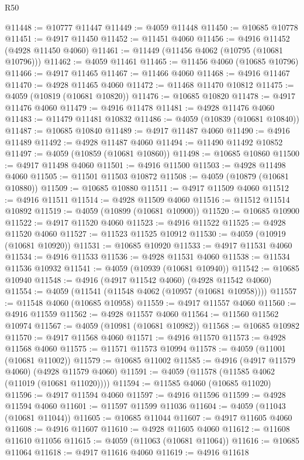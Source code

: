 \begin{lexlean}{R50}
\begin{coremodule}
@11448 := @10777 @11447
@11449 := @4059 @11448
@11450 := @10685 @10778
@11451 := @4917 @11450
@11452 := @11451 @4060
@11456 := @4916 @11452 (@4928 @11450 @4060)
@11461 := @11449 (@11456 @4062 (@10795 (@10681 @10796)))
@11462 := @4059 @11461
@11465 := @11456 @4060 (@10685 @10796)
@11466 := @4917 @11465
@11467 := @11466 @4060
@11468 := @4916 @11467
@11470 := @4928 @11465 @4060
@11472 := @11468 @11470 @10812
@11475 := @4059 (@10819 (@10681 @10820))
@11476 := @10685 @10820
@11478 := @4917 @11476 @4060
@11479 := @4916 @11478
@11481 := @4928 @11476 @4060
@11483 := @11479 @11481 @10832
@11486 := @4059 (@10839 (@10681 @10840))
@11487 := @10685 @10840
@11489 := @4917 @11487 @4060
@11490 := @4916 @11489
@11492 := @4928 @11487 @4060
@11494 := @11490 @11492 @10852
@11497 := @4059 (@10859 (@10681 @10860))
@11498 := @10685 @10860
@11500 := @4917 @11498 @4060
@11501 := @4916 @11500
@11503 := @4928 @11498 @4060
@11505 := @11501 @11503 @10872
@11508 := @4059 (@10879 (@10681 @10880))
@11509 := @10685 @10880
@11511 := @4917 @11509 @4060
@11512 := @4916 @11511
@11514 := @4928 @11509 @4060
@11516 := @11512 @11514 @10892
@11519 := @4059 (@10899 (@10681 @10900))
@11520 := @10685 @10900
@11522 := @4917 @11520 @4060
@11523 := @4916 @11522
@11525 := @4928 @11520 @4060
@11527 := @11523 @11525 @10912
@11530 := @4059 (@10919 (@10681 @10920))
@11531 := @10685 @10920
@11533 := @4917 @11531 @4060
@11534 := @4916 @11533
@11536 := @4928 @11531 @4060
@11538 := @11534 @11536 @10932
@11541 := @4059 (@10939 (@10681 @10940))
@11542 := @10685 @10940
@11548 := @4916 (@4917 @11542 @4060) (@4928 @11542 @4060)
@11554 := @4059 (@11541 (@11548 @4062 (@10957 (@10681 @10958))))
@11557 := @11548 @4060 (@10685 @10958)
@11559 := @4917 @11557 @4060
@11560 := @4916 @11559
@11562 := @4928 @11557 @4060
@11564 := @11560 @11562 @10974
@11567 := @4059 (@10981 (@10681 @10982))
@11568 := @10685 @10982
@11570 := @4917 @11568 @4060
@11571 := @4916 @11570
@11573 := @4928 @11568 @4060
@11575 := @11571 @11573 @10994
@11578 := @4059 (@11001 (@10681 @11002))
@11579 := @10685 @11002
@11585 := @4916 (@4917 @11579 @4060) (@4928 @11579 @4060)
@11591 := @4059 (@11578 (@11585 @4062 (@11019 (@10681 @11020))))
@11594 := @11585 @4060 (@10685 @11020)
@11596 := @4917 @11594 @4060
@11597 := @4916 @11596
@11599 := @4928 @11594 @4060
@11601 := @11597 @11599 @11036
@11604 := @4059 (@11043 (@10681 @11044))
@11605 := @10685 @11044
@11607 := @4917 @11605 @4060
@11608 := @4916 @11607
@11610 := @4928 @11605 @4060
@11612 := @11608 @11610 @11056
@11615 := @4059 (@11063 (@10681 @11064))
@11616 := @10685 @11064
@11618 := @4917 @11616 @4060
@11619 := @4916 @11618

\end{coremodule}
\end{lexlean}
